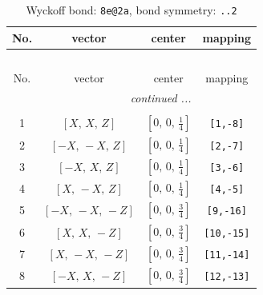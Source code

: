 \documentclass[fleqn,8pt]{jsarticle}
\begin{document}
\begin{longtable}{cccc}
\caption{Wyckoff bond: {\tt 8e@2a}, bond symmetry: {\tt ..2}}
 \\
 \hline \hline
No. & vector & center & mapping \\ \hline \endfirsthead

\multicolumn{3}{l}{\tablename\ \thetable{}} \\
 \hline \hline
No. & vector & center & mapping \\ \hline \endhead

 \hline \hline
\multicolumn{3}{r}{\footnotesize\it continued ...} \\ \endfoot

 \hline \hline
\multicolumn{3}{r}{} \\ \endlastfoot

1 & $\left[ X,\, X,\, Z \right]$ & $\left[ 0,\, 0,\, \frac{1}{4} \right]$ & {\tt [1,-8]} \\ \hline
2 & $\left[ - X,\, - X,\, Z \right]$ & $\left[ 0,\, 0,\, \frac{1}{4} \right]$ & {\tt [2,-7]} \\ \hline
3 & $\left[ - X,\, X,\, Z \right]$ & $\left[ 0,\, 0,\, \frac{1}{4} \right]$ & {\tt [3,-6]} \\ \hline
4 & $\left[ X,\, - X,\, Z \right]$ & $\left[ 0,\, 0,\, \frac{1}{4} \right]$ & {\tt [4,-5]} \\ \hline
5 & $\left[ - X,\, - X,\, - Z \right]$ & $\left[ 0,\, 0,\, \frac{3}{4} \right]$ & {\tt [9,-16]} \\ \hline
6 & $\left[ X,\, X,\, - Z \right]$ & $\left[ 0,\, 0,\, \frac{3}{4} \right]$ & {\tt [10,-15]} \\ \hline
7 & $\left[ X,\, - X,\, - Z \right]$ & $\left[ 0,\, 0,\, \frac{3}{4} \right]$ & {\tt [11,-14]} \\ \hline
8 & $\left[ - X,\, X,\, - Z \right]$ & $\left[ 0,\, 0,\, \frac{3}{4} \right]$ & {\tt [12,-13]} \\
\end{longtable}
\renewcommand{\arraystretch}{1.2}
\end{document}
